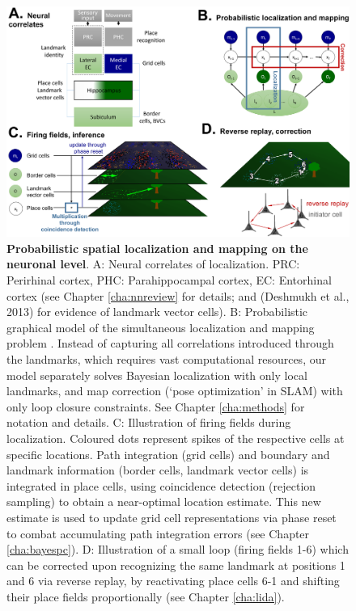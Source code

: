 \begin{figure}[h]
	\centering
	\includegraphics[width=\textwidth]{img/neurimpl3}
	\caption[Probabilistic spatial localization and mapping on the neuronal level]{\textbf{Probabilistic spatial localization and mapping on the neuronal level}. A: Neural correlates of localization. PRC: Perirhinal cortex, PHC: Parahippocampal cortex, EC: Entorhinal cortex (see Chapter \ref{cha:nnreview} for details; and (Deshmukh et al., 2013) for evidence of landmark vector cells). B: Probabilistic graphical model of the simultaneous localization and mapping problem \citep{thrun2008simultaneous}. Instead of capturing all correlations introduced through the landmarks, which requires vast computational resources, our model separately solves Bayesian localization with only local landmarks, and map correction (`pose optimization' in SLAM) with only loop closure constraints. See Chapter \ref{cha:methods} for notation and details. C: Illustration of firing fields during localization. Coloured dots represent spikes of the respective cells at specific locations. Path integration (grid cells) and boundary and landmark information (border cells, landmark vector cells) is integrated in place cells, using coincidence detection (rejection sampling) to obtain a near-optimal location estimate. This new estimate is used to update grid cell representations via phase reset to combat accumulating path integration errors (see Chapter \ref{cha:bayespc}). D: Illustration of a small loop (firing fields 1-6) which can be corrected upon recognizing the same landmark at positions 1 and 6 via reverse replay, by reactivating place cells 6-1 and shifting their place fields proportionally (see Chapter \ref{cha:lida}).
	} 
	\label{fig:neurimpl}
\end{figure}

